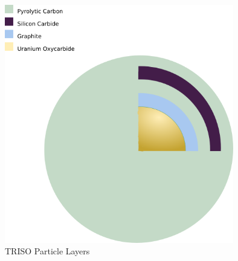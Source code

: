 \begin{figure}[h!]
\centering
\includegraphics[width = 10cm]{figures/trisos-r-like-onions.png}
\caption{TRISO Particle Layers}
\label{fig:particle-layer}
\end{figure}